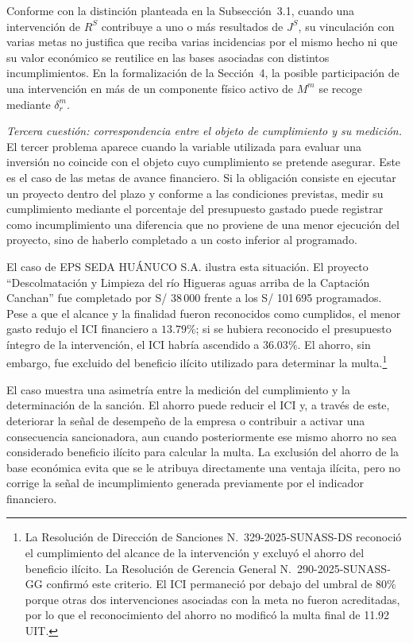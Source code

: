 Conforme con la distinción planteada en la Subsección~3.1, cuando una intervención de \(R^{S}\) contribuye a uno o más resultados de \(J^{S}\), su vinculación con varias metas no justifica que reciba varias incidencias por el mismo hecho ni que su valor económico se reutilice en las bases asociadas con distintos incumplimientos. En la formalización de la Sección~4, la posible participación de una intervención en más de un componente físico activo de \(M^m\) se recoge mediante \(\delta_r^m\).

\textit{Tercera cuestión: correspondencia entre el objeto de cumplimiento y su medición.} El tercer problema aparece cuando la variable utilizada para evaluar una inversión no coincide con el objeto cuyo cumplimiento se pretende asegurar. Este es el caso de las metas de avance financiero. Si la obligación consiste en ejecutar un proyecto dentro del plazo y conforme a las condiciones previstas, medir su cumplimiento mediante el porcentaje del presupuesto gastado puede registrar como incumplimiento una diferencia que no proviene de una menor ejecución del proyecto, sino de haberlo completado a un costo inferior al programado.

El caso de EPS SEDA HUÁNUCO S.A. ilustra esta situación. El proyecto ``Descolmatación y Limpieza del río Higueras aguas arriba de la Captación Canchan'' fue completado por S/ 38\,000 frente a los S/ 101\,695 programados. Pese a que el alcance y la finalidad fueron reconocidos como cumplidos, el menor gasto redujo el ICI financiero a \(13.79\%\); si se hubiera reconocido el presupuesto íntegro de la intervención, el ICI habría ascendido a \(36.03\%\). El ahorro, sin embargo, fue excluido del beneficio ilícito utilizado para determinar la multa.\footnote{La Resolución de Dirección de Sanciones N.\textdegree~329-2025-SUNASS-DS reconoció el cumplimiento del alcance de la intervención y excluyó el ahorro del beneficio ilícito. La Resolución de Gerencia General N.\textdegree~290-2025-SUNASS-GG confirmó este criterio. El ICI permaneció por debajo del umbral de \(80\%\) porque otras dos intervenciones asociadas con la meta no fueron acreditadas, por lo que el reconocimiento del ahorro no modificó la multa final de 11.92 UIT.}

El caso muestra una asimetría entre la medición del cumplimiento y la determinación de la sanción. El ahorro puede reducir el ICI y, a través de este, deteriorar la señal de desempeño de la empresa o contribuir a activar una consecuencia sancionadora, aun cuando posteriormente ese mismo ahorro no sea considerado beneficio ilícito para calcular la multa. La exclusión del ahorro de la base económica evita que se le atribuya directamente una ventaja ilícita, pero no corrige la señal de incumplimiento generada previamente por el indicador financiero.

